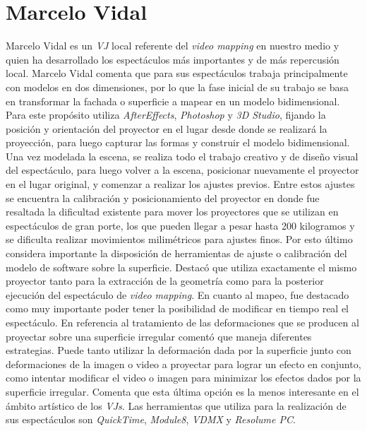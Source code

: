 \section{Marcelo Vidal}
Marcelo Vidal \cite{Chindogu} es un \emph{VJ} local referente del \emph{video mapping} en nuestro medio y quien ha desarrollado los espectáculos más importantes y de más repercusión local.
Marcelo Vidal comenta que para sus espectáculos trabaja principalmente con modelos en dos dimensiones, por lo que la fase inicial de su trabajo se basa en transformar la fachada o superficie a mapear en un modelo bidimensional. Para este propósito utiliza \emph{AfterEffects}, \emph{Photoshop} y \emph{3D Studio}, %
fijando la posición y orientación del proyector en el lugar desde donde se realizará la proyección, para luego capturar las formas y construir el modelo bidimensional.
Una vez modelada la escena, se realiza todo el trabajo creativo y de diseño visual del espectáculo, para luego volver a la escena, posicionar nuevamente el proyector en el lugar original, y comenzar a realizar los ajustes previos. Entre estos ajustes se encuentra la calibración y posicionamiento del proyector en donde fue resaltada la dificultad existente para mover los proyectores que se utilizan en espectáculos de gran porte, los que pueden llegar a pesar hasta 200 kilogramos y se dificulta realizar movimientos milimétricos para ajustes finos. Por esto último considera importante la disposición de herramientas de ajuste o calibración del modelo de software sobre la superficie. Destacó que utiliza exactamente el mismo proyector tanto para la extracción de la geometría como para la posterior ejecución del espectáculo de \emph{video mapping}.
En cuanto al mapeo, fue destacado como muy importante poder tener la posibilidad de modificar en tiempo real el espectáculo. En referencia al tratamiento de las deformaciones que se producen al proyectar sobre una superficie irregular comentó que maneja diferentes estrategias. Puede tanto utilizar la deformación dada por la superficie junto con deformaciones de la imagen o video a proyectar para lograr un efecto en conjunto, como intentar modificar el video o imagen para minimizar los efectos dados por la superficie irregular. Comenta que esta última opción es la menos interesante en el ámbito artístico de los \emph{VJs}. Las herramientas que utiliza para la realización de sus espectáculos son \emph{QuickTime}, \emph{Module8}, \emph{VDMX} y \emph{Resolume PC}.

